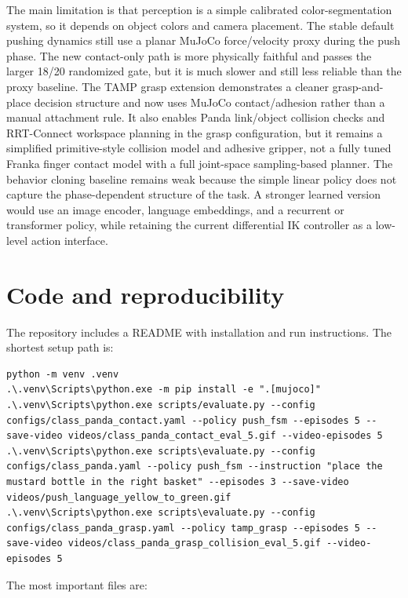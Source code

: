 \documentclass{article}
\begin{document}
The main limitation is that perception is a simple calibrated color-segmentation system, so it depends on object colors and camera placement. The stable default pushing dynamics still use a planar MuJoCo force/velocity proxy during the push phase. The new contact-only path is more physically faithful and passes the larger 18/20 randomized gate, but it is much slower and still less reliable than the proxy baseline. The TAMP grasp extension demonstrates a cleaner grasp-and-place decision structure and now uses MuJoCo contact/adhesion rather than a manual attachment rule. It also enables Panda link/object collision checks and RRT-Connect workspace planning in the grasp configuration, but it remains a simplified primitive-style collision model and adhesive gripper, not a fully tuned Franka finger contact model with a full joint-space sampling-based planner. The behavior cloning baseline remains weak because the simple linear policy does not capture the phase-dependent structure of the task. A stronger learned version would use an image encoder, language embeddings, and a recurrent or transformer policy, while retaining the current differential IK controller as a low-level action interface.

\section{Code and reproducibility}

The repository includes a README with installation and run instructions. The shortest setup path is:

\begin{lstlisting}[style=cmd]
python -m venv .venv
.\.venv\Scripts\python.exe -m pip install -e ".[mujoco]"
.\.venv\Scripts\python.exe scripts/evaluate.py --config configs/class_panda_contact.yaml --policy push_fsm --episodes 5 --save-video videos/class_panda_contact_eval_5.gif --video-episodes 5
.\.venv\Scripts\python.exe scripts\evaluate.py --config configs/class_panda.yaml --policy push_fsm --instruction "place the mustard bottle in the right basket" --episodes 3 --save-video videos/push_language_yellow_to_green.gif
.\.venv\Scripts\python.exe scripts\evaluate.py --config configs/class_panda_grasp.yaml --policy tamp_grasp --episodes 5 --save-video videos/class_panda_grasp_collision_eval_5.gif --video-episodes 5
\end{lstlisting}

The most important files are:
\end{document}
